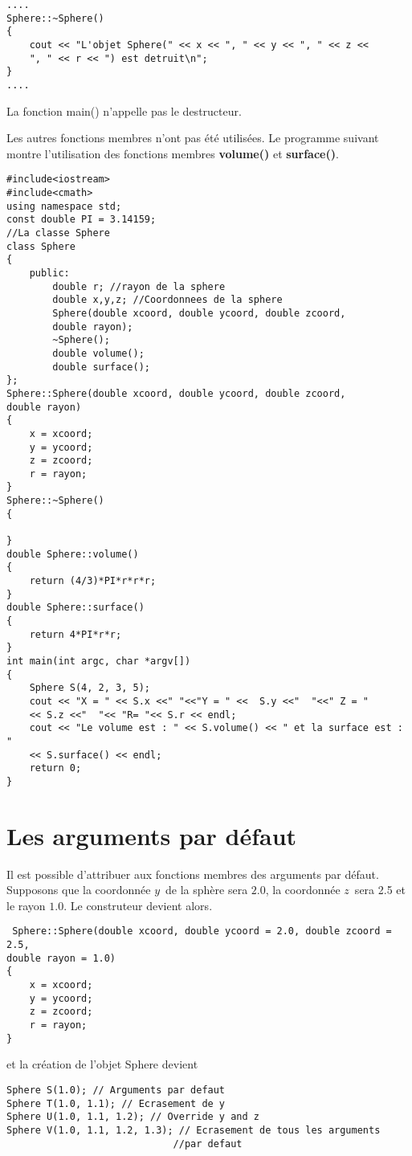 \documentclass[a4paper, oneside,11pt]{book}
\begin{document}
\begin{lstlisting}
....
Sphere::~Sphere()
{
    cout << "L'objet Sphere(" << x << ", " << y << ", " << z << 
    ", " << r << ") est detruit\n";
}
....
\end{lstlisting}
La fonction main() n'appelle pas le destructeur.

Les autres fonctions membres n'ont pas \'et\'e utilis\'ees. Le programme suivant montre l'utilisation des fonctions membres \textbf{volume()} et \textbf{surface()}.

\begin{lstlisting}
#include<iostream>
#include<cmath>
using namespace std;
const double PI = 3.14159;
//La classe Sphere
class Sphere
{
    public:
        double r; //rayon de la sphere
        double x,y,z; //Coordonnees de la sphere
        Sphere(double xcoord, double ycoord, double zcoord, 
        double rayon);
        ~Sphere();
        double volume();
        double surface();
};
Sphere::Sphere(double xcoord, double ycoord, double zcoord, 
double rayon)
{
    x = xcoord;
    y = ycoord;
    z = zcoord;
    r = rayon;
}
Sphere::~Sphere()
{

}
double Sphere::volume()
{
    return (4/3)*PI*r*r*r;
}
double Sphere::surface()
{
    return 4*PI*r*r;
}
int main(int argc, char *argv[])
{
    Sphere S(4, 2, 3, 5);
    cout << "X = " << S.x <<" "<<"Y = " <<  S.y <<"  "<<" Z = " 
    << S.z <<"  "<< "R= "<< S.r << endl;
    cout << "Le volume est : " << S.volume() << " et la surface est : "
    << S.surface() << endl;
    return 0;
}
\end{lstlisting}

\section{Les arguments par d\'efaut}
Il est possible d'attribuer aux fonctions membres des arguments par d\'efaut. Supposons que la coordonn\'ee $y$\ de la sph\`ere sera $2.0$, la coordonn\'ee $z$\ sera 2.5 et  le rayon
 $1.0$. Le construteur devient alors.
 
 \begin{lstlisting}
 Sphere::Sphere(double xcoord, double ycoord = 2.0, double zcoord = 2.5, 
double rayon = 1.0)
{
    x = xcoord;
    y = ycoord;
    z = zcoord;
    r = rayon;
}
\end{lstlisting}


et la cr\'eation de l'objet Sphere devient

\begin{lstlisting}
Sphere S(1.0); // Arguments par defaut
Sphere T(1.0, 1.1); // Ecrasement de y
Sphere U(1.0, 1.1, 1.2); // Override y and z
Sphere V(1.0, 1.1, 1.2, 1.3); // Ecrasement de tous les arguments 
                             //par defaut
\end{lstlisting}
\end{document}
